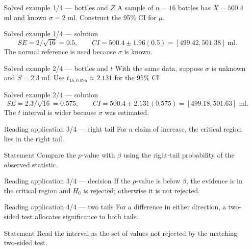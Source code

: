 \documentclass[10pt,aspectratio=169]{beamer}
\begin{document}
\begin{frame}{Solved example 1/4 --- bottles and $Z$}
  \footnotesize
  A sample of $n=16$ bottles has $\bar X=500.4$ ml and known $\sigma=2$ ml.
  Construct the 95\% CI for $\mu$.
\end{frame}

\begin{frame}{Solved example 1/4 --- solution}
  \footnotesize
  \[
    SE=2/\sqrt{16}=0.5,\qquad
    CI=500.4\pm1.96(0.5)=[499.42,501.38]\text{ ml}.
  \]
  The normal reference is used because $\sigma$ is known.
\end{frame}

\begin{frame}{Solved example 2/4 --- bottles and $t$}
  \footnotesize
  With the same data, suppose $\sigma$ is unknown and $S=2.3$ ml. Use
  $t_{15,0.025}\approx2.131$ for the 95\% CI.
\end{frame}

\begin{frame}{Solved example 2/4 --- solution}
  \footnotesize
  \[
    SE=2.3/\sqrt{16}=0.575,\qquad
    CI=500.4\pm2.131(0.575)=[499.18,501.63]\text{ ml}.
  \]
  The $t$ interval is wider because $\sigma$ was estimated.
\end{frame}

\begin{frame}{Reading application 3/4 --- right tail}
  \footnotesize
  For a claim of increase, the critical region lies in the right tail.
  \begin{block}{Statement}
    Compare the $p$-value with $\beta$ using the right-tail probability of the
    observed statistic.
  \end{block}
\end{frame}

\begin{frame}{Reading application 3/4 --- decision}
  \footnotesize
  If the $p$-value is below $\beta$, the evidence is in the critical region and
  $H_0$ is rejected; otherwise it is not rejected.
\end{frame}

\begin{frame}{Reading application 4/4 --- two tails}
  \footnotesize
  For a difference in either direction, a two-sided test allocates significance
  to both tails.
  \begin{block}{Statement}
    Read the interval as the set of values not rejected by the matching
    two-sided test.
  \end{block}
\end{frame}
\end{document}
